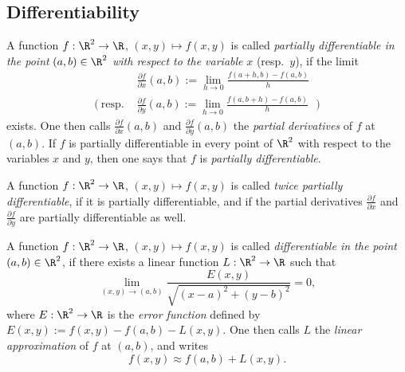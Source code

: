 \subsection{Differentiability}

\begin{definition}
  A function $f:\R^2 \rightarrow \R$, $(x,y)\mapsto f(x,y)$ is called 
  \emph{partially differentiable in the point} 
  $(a,b) \in \R^2$ \emph{with respect to the variable} $x$ (resp.~$y$), 
  if the limit
\begin{equation*}
  \begin{split}
   & \frac{\partial f}{\partial x} (a,b) := \lim_{h\rightarrow 0} \frac{ f (a+h,b) - f(a,b)}{h} \\
   \Big( \: \text{resp. } &\frac{\partial f}{\partial y} (a,b) 
   := \lim_{h\rightarrow 0} \frac{ f (a,b+h) - f(a,b)}{h} \:\:\: \Big)
  \end{split}
\end{equation*}
exists. One then calls  $\frac{\partial f}{\partial x} (a,b)$ and 
$\frac{\partial f}{\partial y} (a,b)$ the \emph{partial derivatives} of $f$ at $(a,b)$. 
If $f$  is partially differentiable in every  point of $\R^2$ with respect to the variables $x$ and $y$, 
then one says that $f$ is \emph{partially differentiable}.
 
 A function $f:\R^2 \rightarrow \R$, $(x,y)\mapsto f(x,y)$ is called \emph{twice partially differentiable}, 
 if it is partially differentiable, and if the partial derivatives  
 $\frac{\partial f}{\partial x}$ and $\frac{\partial f}{\partial y}$ are partially differentiable as well.
 
 A function $f:\R^2 \rightarrow \R$, $(x,y)\mapsto f(x,y)$ is called \emph{differentiable in the point} $(a,b) \in \R^2$, 
 if there exists a linear function $L:\R^2\rightarrow \R$ such that 
 \begin{displaymath}
   \lim_{(x,y) \rightarrow (a,b)} \frac{E(x,y)}{\sqrt{(x-a)^2 + (y-b)^2}} =0,
 \end{displaymath}
 where $E:\R^2\rightarrow \R$ is the \emph{error function} defined by 
 $E(x,y) := f(x,y)-f(a,b) -L(x,y)$. One then calls $L$ the \emph{linear approximation} of $f$ at $(a,b)$,
 and writes 
 \begin{displaymath}
   f(x,y) \approx f(a,b) + L (x,y) .
 \end{displaymath}
\end{definition}

